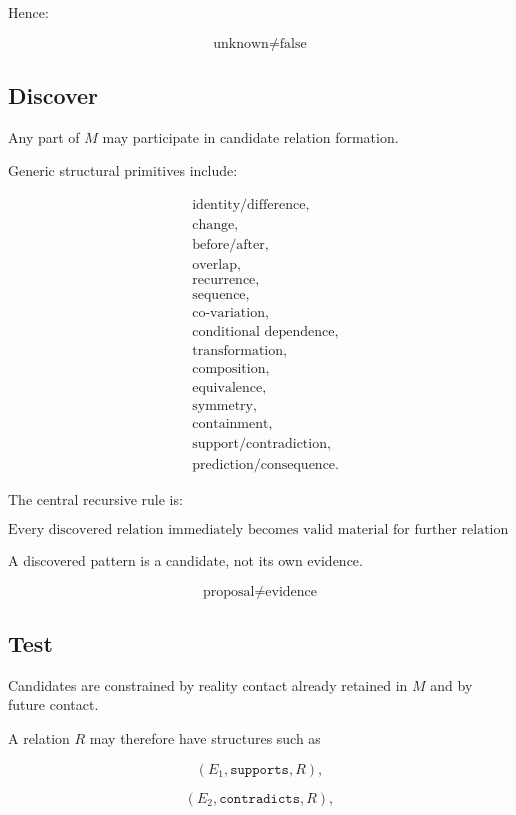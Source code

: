\documentclass[11pt]{article}
\begin{document}
Hence:

\[
\boxed{\text{unknown}\neq\text{false}}
\]

\subsection{Discover}

Any part of $M$ may participate in candidate relation formation.

Generic structural primitives include:

\[
\begin{aligned}
&\text{identity/difference},\\
&\text{change},\\
&\text{before/after},\\
&\text{overlap},\\
&\text{recurrence},\\
&\text{sequence},\\
&\text{co-variation},\\
&\text{conditional dependence},\\
&\text{transformation},\\
&\text{composition},\\
&\text{equivalence},\\
&\text{symmetry},\\
&\text{containment},\\
&\text{support/contradiction},\\
&\text{prediction/consequence}.
\end{aligned}
\]

The central recursive rule is:

\[
\boxed{
\text{Every discovered relation immediately becomes valid material for further relation discovery.}
}
\]

A discovered pattern is a candidate, not its own evidence.

\[
\boxed{\text{proposal}\neq\text{evidence}}
\]

\subsection{Test}

Candidates are constrained by reality contact already retained in $M$ and by future contact.

A relation $R$ may therefore have structures such as

\[
(E_1,\texttt{supports},R),
\]

\[
(E_2,\texttt{contradicts},R),
\]
\end{document}
